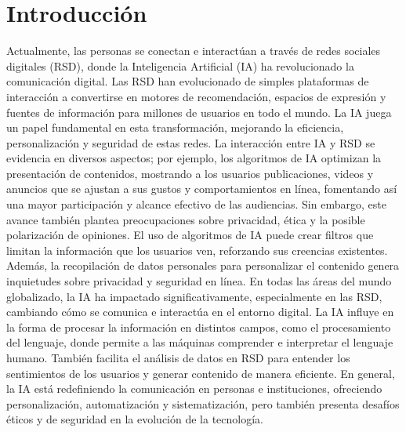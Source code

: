 \documentclass[runningheads]{llncs}
\begin{document}
\section{Introducción}
Actualmente, las personas se conectan e interactúan a través de redes sociales digitales (RSD), donde la Inteligencia Artificial (IA) ha revolucionado la comunicación digital. Las RSD han evolucionado de simples plataformas de interacción a convertirse en motores de recomendación, espacios de expresión y fuentes de información para millones de usuarios en todo el mundo. La IA juega un papel fundamental en esta transformación, mejorando la eficiencia, personalización y seguridad de estas redes.
La interacción entre IA y RSD se evidencia en diversos aspectos; por ejemplo, los algoritmos de IA optimizan la presentación de contenidos, mostrando a los usuarios publicaciones, videos y anuncios que se ajustan a sus gustos y comportamientos en línea, fomentando así una mayor participación y alcance efectivo de las audiencias. Sin embargo, este avance también plantea preocupaciones sobre privacidad, ética y la posible polarización de opiniones. 
El uso de algoritmos de IA puede crear filtros que limitan la información que los usuarios ven, reforzando sus creencias existentes. Además, la recopilación de datos personales para personalizar el contenido genera inquietudes sobre privacidad y seguridad en línea. En todas las áreas del mundo globalizado, la IA ha impactado significativamente, especialmente en las RSD, cambiando cómo se comunica e interactúa en el entorno digital.
La IA influye en la forma de procesar la información en distintos campos, como el procesamiento del lenguaje, donde permite a las máquinas comprender e interpretar el lenguaje humano. También facilita el análisis de datos en RSD para entender los sentimientos de los usuarios y generar contenido de manera eficiente. En general, la IA está redefiniendo la comunicación en personas e instituciones, ofreciendo personalización, automatización y sistematización, pero también presenta desafíos éticos y de seguridad en la evolución de la tecnología.

\end{document}
